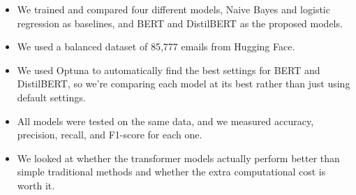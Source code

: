 \documentclass{article}
\begin{document}
\begin{itemize}
    \item We trained and compared four different models, Naive Bayes and logistic regression as baselines, and  BERT and DistilBERT as the proposed models.
    \item We used a balanced dataset of 85,777 emails from Hugging Face.
    \item  We used Optuna to automatically find the best settings for BERT and DistilBERT, so we're comparing each model at its best rather than just using default settings.
    \item All models were tested on the same data, and we measured accuracy, precision, recall, and F1-score for each one.
    \item  We looked at whether the transformer models actually perform better than simple traditional methods and whether the extra computational cost is worth it.
\end{itemize}
\end{document}
